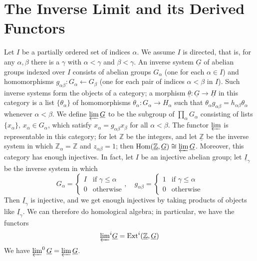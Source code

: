 \documentclass[../main]{subfiles}
\begin{document}
\label{sec:p3c08}
\chapter{The Inverse Limit and its Derived Functors}

Let $I$ be a partially ordered set of indices $\alpha$. We assume $I$ is directed, that is, for any $\alpha,\beta$ there is a $\gamma$ with $\alpha < \gamma$ and $\beta<\gamma$. An inverse system $\underline{G}$ of abelian groups indexed over $I$ consists of abelian groups $G_\alpha$ (one for each $\alpha \in I$) and homomorphisms $g_{\alpha\beta}:G_\alpha \longleftarrow G_\beta$ (one for each pair of indices $\alpha<\beta$ in $I$). Such inverse systems form the objects of a category; a morphism $\underline{\theta}:\underline{G}\longrightarrow\underline{H}$ in this category is a list $\{\theta_\alpha\}$ of homomorphisms $\theta_\alpha:G_\alpha \to H_\alpha$ such that $\theta_\alpha g_{\alpha\beta} = h_{\alpha\beta}\theta_\alpha$ whenever $\alpha < \beta$. We define $\varprojlim\underline{G}$ to be the subgroup of $\prod_\alpha G_\alpha$ consisting of lists $\{x_\alpha\}$, $x_\alpha\in G_\alpha$, which satisfy $x_\alpha = g_{\alpha\beta}x_\beta$ for all $\alpha<\beta$. The functor $\varprojlim$ is representable in this category; for let $\mathbb{Z}$ be the integers, and let $\underline{\mathbb{Z}}$ be the inverse system in which $\mathbb{Z}_\alpha = \mathbb{Z}$ and $z_{\alpha\beta}=1$; then $\operatorname{Hom}(\underline{\mathbb{Z}},\underline{G})\cong \varprojlim\underline{G}$. Moreover, this category has enough injectives. In fact, let $I$ be an injective abelian group; let $\underline{I}_\gamma$ be the inverse system in which
\[G_\alpha=\begin{cases}
  I  & \text{if } \gamma\leq\alpha \\
  0 & \text{otherwise}
\end{cases}, \quad 
g_{\alpha\beta}=\begin{cases} 1 & \text{if } \gamma\leq\alpha \\ 0 & \text{otherwise} \end{cases}\] 
Then $\underline{I}_\gamma$ is injective, and we get enough injectives by taking products of objects like $\underline{I}_\gamma$. We can therefore do homological algebra; in particular, we have the functors 
\[{\varprojlim}^i\underline{G}=\operatorname{Ext}^i(\underline{\mathbb{Z}},\underline{G})\]
We have $\varprojlim^0\underline{G}=\varprojlim\underline{G}$. \\
\end{document}
